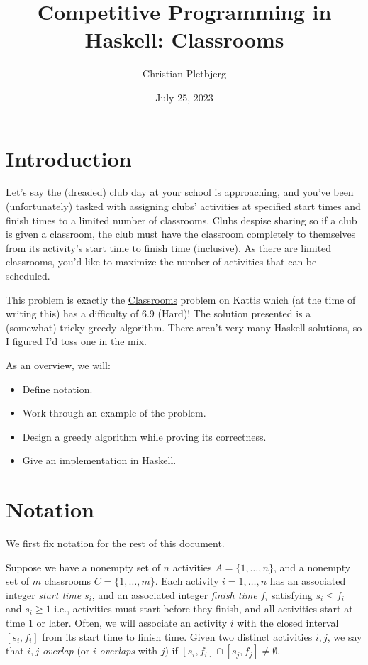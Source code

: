 \documentclass{article}
\title{Competitive Programming in Haskell: Classrooms}
\author{Christian Pletbjerg}
\date{July 25, 2023}
\theoremstyle{plain}%
\theoremstyle{definition}
\theoremstyle{remark}
\begin{document}
\maketitle

\tableofcontents

\section{Introduction}
Let's say the (dreaded) club day at your school is approaching, and you've been
    (unfortunately) tasked with assigning clubs' activities at specified start
    times and finish times to a limited number of classrooms.
Clubs despise sharing so if a club is given a classroom, the club must have the
    classroom completely to themselves from its activity's start time to finish
    time (inclusive).
As there are limited classrooms, you'd like to maximize the number of
    activities that can be scheduled.

This problem is exactly the
    \href{https://open.kattis.com/problems/classrooms}{Classrooms} problem on
    Kattis which (at the time of writing this) has a difficulty of 6.9 (Hard)!
The solution presented is a (somewhat) tricky greedy algorithm.
There aren't very many Haskell solutions, so I figured I'd toss one in
    the mix.

As an overview, we will:
\begin{itemize}
    \item Define notation.
    \item Work through an example of the problem.
    \item Design a greedy algorithm while proving its correctness.
    \item Give an implementation in Haskell.
\end{itemize}

\section{Notation}
We first fix notation for the rest of this document.

Suppose we have a nonempty set of $n$ activities $A = \{1,\dots,n\}$, 
    and a nonempty set of $m$ classrooms $C = \{1,\dots,m\}$.
Each activity $i = 1,\dots, n$ has an associated integer \emph{start time} $s_i$, and
    an associated integer \emph{finish time} $f_i$ satisfying $s_i \le f_i$ and $s_i \ge 1$ 
    i.e., activities must start before they finish, and all activities start
    at time $1$ or later.
Often, we will associate an activity $i$ with the closed interval $[s_i,f_i]$
    from its start time to finish time.
Given two distinct activities $i,j$, we say that $i,j$ \emph{overlap} (or $i$
    \emph{overlaps} with $j$) if $[s_i, f_i] \cap [s_j,f_j] \neq \emptyset$.
\end{document}
